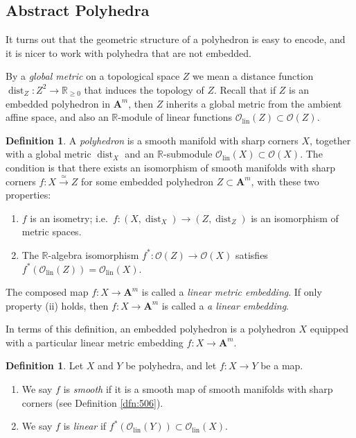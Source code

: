 \documentclass[10pt, a4paper]{amsart}
\theoremstyle{definition}
\newtheorem{dfn}[equation]{Definition}
\numberwithin{equation}{section}
\newcommand{\iso}{\xrightarrow{\simeq}}
\newcommand{\opn}{\operatorname}
\newcommand{\rmitem}[1]{\item[\text{\textup{(#1)}}]}
\newcommand{\mcal}[1]{\mathcal{#1}}
\newcommand{\mbf}[1]{\mathbf{#1}}
\newcommand{\mrm}[1]{\mathrm{#1}}
\newcommand{\mbb}[1]{\mathbb{#1}}
\newcommand{\R}{\mbb{R}}
\newcommand{\lb}{\linebreak}
\begin{document}
\subsection{Abstract Polyhedra} \label{subsec:abspoly}
It turns out that the geometric structure of a polyhedron is easy to
encode, and it is nicer to work
with polyhedra that are not embedded. 

By a {\em global metric} on a topological space $Z$ we mean a distance function 
$\opn{dist}_Z : Z^2 \to \R_{\geq 0}$ that induces the topology of $Z$. 
Recall that if $Z$ is an embedded polyhedron in $\mbf{A}^m$, then $Z$ inherits
a global metric from the ambient affine space, and also an $\R$-module 
of linear functions 
$\mcal{O}_{\mrm{lin}}(Z) \subset \mcal{O}(Z)$. 

\begin{dfn} \label{dfn:503}
A {\em polyhedron} 
 is a smooth manifold with sharp corners
$X$, together with a global metric $\opn{dist}_X$ and an $\R$-submodule
$\mcal{O}_{\mrm{lin}}(X) \subset \mcal{O}(X)$.
The condition is that there exists an isomorphism 
of smooth manifolds with sharp corners
$f : X \iso Z$ for some embedded
polyhedron $Z \subset \mbf{A}^{m}$, with these two properties:
\begin{enumerate}
\rmitem{i} $f$ is an isometry; i.e.\ 
$f : (X, \opn{dist}_X) \to (Z, \opn{dist}_Z)$ is an isomorphism of metric
spaces.

\rmitem{ii} The $\R$-algebra isomorphism
$f^* : \mcal{O}(Z) \to \mcal{O}(X)$
satisfies \lb
$f^*(\mcal{O}_{\mrm{lin}}(Z)) = \mcal{O}_{\mrm{lin}}(X)$.
\end{enumerate}
The composed map $f : X \to \mbf{A}^{m}$ is called a {\em
linear metric embedding}.
If only property (ii) holds, then $f : X \to \mbf{A}^{m}$ is called a {\em
a linear embedding}.
\end{dfn}

In terms of this definition, an embedded polyhedron is a polyhedron $X$ \lb
equipped with a particular linear metric embedding $f : X \to \mbf{A}^{m}$.

\begin{dfn} \label{dfn:512}
Let $X$ and $Y$ be polyhedra, and let $f : X \to Y$ be a map. 
\begin{enumerate}
\item We say $f$ is {\em smooth} if it is a smooth map of smooth manifolds with
sharp corners (see Definition \ref{dfn:506}).

\item We say $f$ is {\em linear} if 
$f^*(\mcal{O}_{\mrm{lin}}(Y)) \subset \mcal{O}_{\mrm{lin}}(X)$.
\end{enumerate}
\end{dfn}
\end{document}
